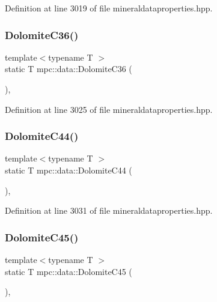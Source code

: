 Definition at line 3019 of file mineraldataproperties.\+hpp.

\mbox{\label{namespacempc_1_1data_a01cf014eaa7d90a04a64a1828e59f5fa}} 
\subsubsection{\texorpdfstring{Dolomite\+C36()}{DolomiteC36()}}
{\footnotesize\ttfamily template$<$typename T $>$ \\
static T mpc\+::data\+::\+Dolomite\+C36 (\begin{DoxyParamCaption}{ }\end{DoxyParamCaption})\hspace{0.3cm}{\ttfamily [inline]}, {\ttfamily [static]}}



Definition at line 3025 of file mineraldataproperties.\+hpp.

\mbox{\label{namespacempc_1_1data_ac91d560c4e6b016ba2b173abab7b343b}} 
\subsubsection{\texorpdfstring{Dolomite\+C44()}{DolomiteC44()}}
{\footnotesize\ttfamily template$<$typename T $>$ \\
static T mpc\+::data\+::\+Dolomite\+C44 (\begin{DoxyParamCaption}{ }\end{DoxyParamCaption})\hspace{0.3cm}{\ttfamily [inline]}, {\ttfamily [static]}}



Definition at line 3031 of file mineraldataproperties.\+hpp.

\mbox{\label{namespacempc_1_1data_ac1c0910f14182b11b199cdabe4adb2cb}} 
\subsubsection{\texorpdfstring{Dolomite\+C45()}{DolomiteC45()}}
{\footnotesize\ttfamily template$<$typename T $>$ \\
static T mpc\+::data\+::\+Dolomite\+C45 (\begin{DoxyParamCaption}{ }\end{DoxyParamCaption})\hspace{0.3cm}{\ttfamily [inline]}, {\ttfamily [static]}}



